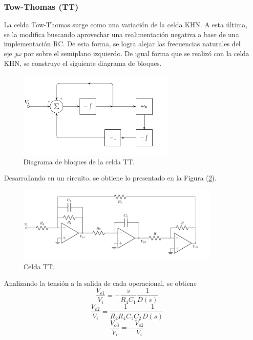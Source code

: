 \subsubsection{Tow-Thomas (TT)}
La celda Tow-Thomas %
surge como una variación de la celda KHN. A esta última, se la modifica buscando aprovechar una realimentación negativa a base de una implementación RC. De esta forma, se logra alejar las frecuencias naturales del eje $j\omega$ por sobre el semiplano izquierdo. De igual forma que se realizó con la celda KHN, se construye el siguiente diagrama de bloques.
\begin{figure}[H]
\centering
	\includegraphics[width=0.7\textwidth]{ImagenesEjercicio4/Bloques-TT.pdf}
	\caption{Diagrama de bloques de la celda TT.}
	\label{fig:blockTT}
\end{figure}

Desarrollando en un circuito, se obtiene lo presentado en la Figura (\ref{fig:TT}).
\begin{figure}[H]
\centering
	\includegraphics[width=0.9\textwidth]{ImagenesEjercicio4/TT.pdf}
	\caption{Celda TT.}
	\label{fig:TT}
\end{figure}

Analizando la tensión a la salida de cada operacional, se obtiene
\begin{equation}
	\frac{V_{o1}}{V_i} = -\frac{s}{R_4C_1}\frac{1}{D(s)}
\end{equation}
\begin{equation}
	\frac{V_{o2}}{V_i} = \frac{1}{R_2 R_4 C_1 C_2}\frac{1}{D(s)}
\end{equation}
\begin{equation}
	\frac{V_{o3}}{V_i} = -\frac{V_{o2}}{V_i}
\end{equation}

